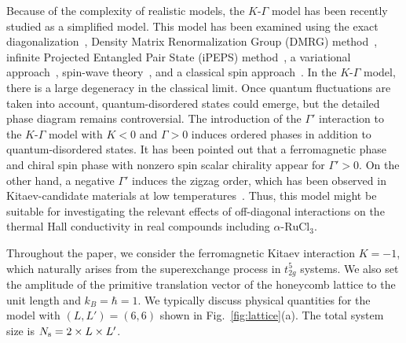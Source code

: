 \documentclass[twocolumn,superscriptaddress,showpacs, longbibliography, aps, prb]{revtex4-2}
\newcommand{\red}[1]{\textcolor{red}{#1}}
\newcommand{\orange}[1]{\textcolor{orange}{#1}}
\begin{document}
Because of the complexity of realistic models, the $K$-$\Gamma$ model has been recently studied %
as a simplified model.
This model has been examined %
using the exact diagonalization~\cite{catuneanu2018,Yamada2020}, Density Matrix Renormalization Group (DMRG) method~\cite{Gohlke_PRB2018}, 
infinite Projected Entangled Pair State (iPEPS) method~\cite{Lee_NCom2020,ZhangLLLW2023}, a variational approach~\cite{Zhang2021}, spin-wave theory~\cite{Smit2020}, and a classical spin approach~\cite{Rayyan2021}.
In the $K$-$\Gamma$ model, there is a large degeneracy in the classical limit.
Once quantum fluctuations are taken into account, quantum-disordered states could %
emerge, but the detailed phase diagram %
remains controversial.
The introduction of the $\Gamma'$ interaction to the $K$-$\Gamma$ model with $K<0$ and $\Gamma>0$ %
induces ordered phases in addition to quantum-disordered states.
It has been pointed out that a ferromagnetic phase and chiral spin phase with nonzero spin scalar chirality appear %
for $\Gamma'>0$\cite{Luo2022PRR,Luo2022}.
On the other hand, %
a negative $\Gamma'$ induces the zigzag order, which has been observed in Kitaev-candidate materials at low temperatures~\cite{Rusna2019,gordon2019theory,Chern2020,Lee_NCom2020}.%
Thus, this model might be suitable %
for investigating the relevant 
effects of off-diagonal interactions on the thermal Hall conductivity in real compounds including $\alpha$-$\mathrm{RuCl_3}$.


Throughout the paper, we consider the ferromagnetic Kitaev interaction $K= -1$, which %
naturally arises from the superexchange process in $t_{2g}^5$ systems. 
We also set the amplitude of the primitive translation vector of the honeycomb 
lattice to the unit length and $k_B = \hbar = 1$. We typically discuss %
physical quantities 
for the model %
with $(L, L') = (6, 6)$ shown in Fig.~\ref{fig:lattice}(a). The total system size is %
$N_{\rm s}=2\times L\times L^{\prime}$.
\end{document}
